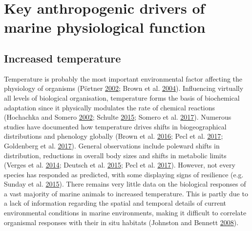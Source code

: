 \documentclass[a4paper,10pt, oneside]{memoir}
\begin{document}
\hypertarget{key-anthropogenic-drivers-of-marine-physiological-function}{%
\section{Key anthropogenic drivers of marine physiological function}\label{key-anthropogenic-drivers-of-marine-physiological-function}}

\hypertarget{increased-temperature}{%
\subsection{Increased temperature}\label{increased-temperature}}

Temperature is probably the most important environmental factor affecting the physiology of organisms (Pörtner \protect\hyperlink{ref-Portner2002}{2002}; Brown et al. \protect\hyperlink{ref-Brown2004}{2004}).
Influencing virtually all levels of biological organisation, temperature forms the basis of biochemical adaptation since it physically modulates the rate of chemical reactions (Hochachka and Somero \protect\hyperlink{ref-Hochachka2002}{2002}; Schulte \protect\hyperlink{ref-Schulte2015}{2015}; Somero et al. \protect\hyperlink{ref-Somero2017}{2017}).
Numerous studies have documented how temperature drives shifts in biogeographical distributions and phenology globally (Brown et al. \protect\hyperlink{ref-Brown2016}{2016}; Pecl et al. \protect\hyperlink{ref-Pecl2017}{2017}; Goldenberg et al. \protect\hyperlink{ref-Goldenberg2017}{2017}).
General observations include poleward shifts in distribution, reductions in overall body sizes and shifts in metabolic limits (Verges et al. \protect\hyperlink{ref-Verges2014}{2014}; Deutsch et al. \protect\hyperlink{ref-Deutsch2015}{2015}; Pecl et al. \protect\hyperlink{ref-Pecl2017}{2017}).
However, not every species has responded as predicted, with some displaying signs of resilience (e.g. Sunday et al. \protect\hyperlink{ref-Sunday2015}{2015}).
There remains very little data on the biological responses of a vast majority of marine animals to increased temperature.
This is partly due to a lack of information regarding the spatial and temporal details of current environmental conditions in marine environments, making it difficult to correlate organismal responses with their in situ habitats (Johnston and Bennett \protect\hyperlink{ref-Johnston2008}{2008}).
\end{document}
